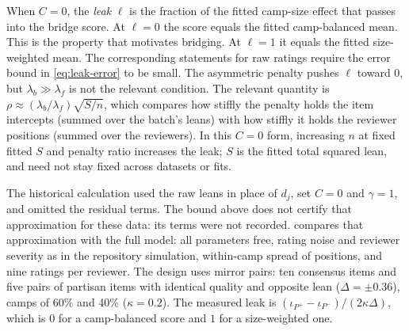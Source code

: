 When $C=0$, the \emph{leak} $\ell$ is the fraction of the fitted camp-size effect that
passes into the bridge score. At $\ell=0$ the score equals the fitted camp-balanced mean. This is
the property that motivates bridging. At $\ell=1$ it equals the fitted size-weighted mean. The corresponding statements for raw
ratings require the error bound in \eqref{eq:leak-error} to be small. The asymmetric penalty pushes $\ell$ toward $0$, but
$\lambda_b\gg\lambda_f$ is not the relevant condition. The relevant quantity is
$\rho\approx(\lambda_b/\lambda_f)\sqrt{S/n}$, which compares how stiffly the penalty holds the
item intercepts (summed over the batch's leans) with how stiffly it holds the reviewer positions
(summed over the reviewers). In this $C=0$ form, increasing $n$ at fixed fitted $S$ and penalty ratio increases the leak;
$S$ is the fitted total squared lean, and need not stay fixed across datasets or fits.

The historical calculation used the raw leans in place of $d_j$, set $C=0$ and $\gamma=1$,
and omitted the residual terms. The bound above does not certify that approximation for these
data: its terms were not recorded.  compares that approximation with the full model:
all parameters free, rating noise and reviewer severity as in the repository simulation,
within-camp spread of positions, and nine ratings per reviewer. The design uses mirror pairs:
ten consensus items and five pairs of partisan items with identical quality and opposite lean
($\Delta=\pm0.36$), camps of 60\% and 40\% ($\kappa=0.2$). The measured leak is
$(\iota_{P^+}-\iota_{P^-})/(2\kappa\Delta)$, which is $0$ for a camp-balanced score and $1$ for a
size-weighted one.

\begin{table}[t]
\centering\small
\caption{Majoritarian leak $\ell$ of the bridge score: measured on the full model (mean of three
datasets; standard deviation in parentheses) against the approximation $1/(1+\rho)$ using raw leans, $C=0$ and $\gamma=1$,
not the exact residual-aware identity of \cref{prop:leak}. Mirror-pair design, 60/40 camps. The default penalties are
$\lambda_b/\lambda_f=5$. Source: \texttt{scripts/levelA\_leak.py}.}
\label{tab:leak}
\end{table}

